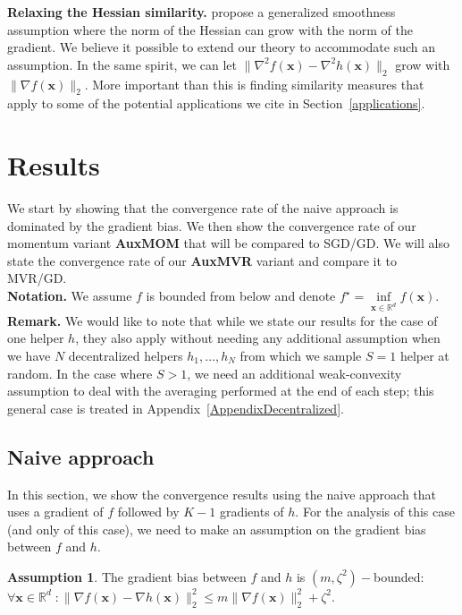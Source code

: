 \documentclass[10pt]{article} %
\theoremstyle{plain}
\theoremstyle{definition}
\newtheorem{assumption}[theorem]{Assumption}
\theoremstyle{remark}
\newcommand{\norm}[1]{\|#1\|_2}
\def\vx{{\bm{x}}}
\newcommand{\R}{\mathbb{R}}
\begin{document}
\textbf{Relaxing the Hessian similarity.} \citet{GeneralizedSmoothness} propose a generalized smoothness assumption where the norm of the Hessian can grow with the norm of the gradient. We believe it possible to extend our theory to accommodate such an assumption. In the same spirit, we can let $\norm{\nabla^2 f(\vx) - \nabla^2 h(\vx)}$ grow with $\norm{\nabla f(\vx)}$. More important than this is finding similarity measures that apply to some of the potential applications we cite in Section~\ref{applications}.

\section{Results}
We start by showing that the convergence rate of the naive approach is dominated by the gradient bias. We then show the convergence rate of our momentum variant \textbf{AuxMOM} that will be compared to SGD/GD. We will also state the convergence rate of our \textbf{AuxMVR} variant and compare it to MVR/GD.\\
\textbf{Notation.} We assume $f$ is bounded from below and denote $f^\star = \underset{\vx\in\R^d}{\inf }f(\vx)$. \\
\textbf{Remark.} We would like to note that while we state our results for the case of one helper $h$, they also apply without needing any additional assumption when we have $N$ decentralized helpers $h_1,\ldots,h_N$ from which we sample $S = 1$ helper at random. In the case where $S>1$, we need an additional weak-convexity assumption to deal with the averaging performed at the end of each step; this general case is treated in Appendix~\ref{AppendixDecentralized}.


\subsection{Naive approach}
In this section, we show the convergence results using the naive approach that uses a gradient of $f$ followed by $K-1$ gradients of $h$. For the analysis of this case (and only of this case), we need to make an assumption on the gradient bias between $f$ and $h$.
\begin{assumption}
\label{BGD}
The gradient bias between $f$ and $h$ is $(m,\zeta^2)-$bounded:
$\forall \vx\in\R^d\; : \norm{\nabla f(\vx) - \nabla h(\vx)}^2\leq m\norm{\nabla f(\vx)}^2 + \zeta^2.$
\end{assumption}
\end{document}
